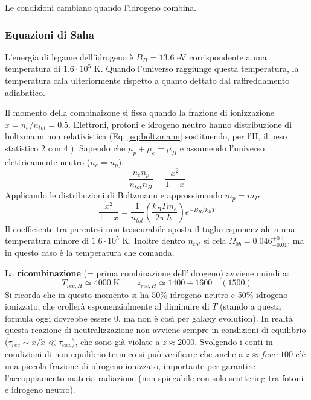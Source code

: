 {Le condizioni cambiano quando l'idrogeno combina.

\subsubsection{Equazioni di Saha}
L'energia di legame dell'idrogeno è $B_H=13.6$ eV corrispondente a una temperatura di $1.6\cdot 10^5$ K. Quando l'universo raggiunge questa temperatura, la temperatura cala ulteriormente rispetto a quanto dettato dal raffreddamento adiabatico. 

Il momento della combinaizone si fissa quando la frazione di ionizzazione $x=n_e/n_{tot}=0.5$. Elettroni, protoni e idrogeno neutro hanno distribuzione di boltzmann non relativistica (Eq. \ref{eq:boltzmann} sostituendo, per l'H, il peso statistico $2$ con $4$ ). Sapendo che $\mu_p + \mu_e = \mu_H$ e assumendo l'universo elettricamente neutro ($n_e=n_p$):
\begin{equation}
    \frac{n_e n_p}{n_{tot}n_H}=\frac{x^2}{1-x}
\end{equation}
Applicando le distribuzioni di Boltzmann e approssimando $m_p=m_H$:
\begin{equation}
    \frac{x^2}{1-x} = \frac{1}{n_{tot}}\left( \frac{k_B T m_e}{2 \pi \hslash }\right) e^{- B_H / k_B T } 
\end{equation}
Il coefficiente tra parentesi non trascurabile sposta il taglio esponenziale a una temperatura minore di $1.6\cdot 10^5$ K. Inoltre dentro $n_{tot}$ si cela $\Omega_{0b}=0.046^{+0.1}_{-0.01}$, ma in questo caso è la temperatura che comanda. 

\vspace{1em}
La \textbf{ricombinazione} (= prima combinazione dell'idrogeno) avviene quindi a: $$T_{rec,H} \simeq 4000\; \textrm{K} \qquad z_{rec,H}\simeq 1400 \div 1600\quad (1500) $$
Si ricorda che in questo momento si ha 50\% idrogeno neutro e 50\% idrogeno ionizzato, che crollerà esponenzialmente al diminuire di $T$ (stando a questa formula oggi dovrebbe essere $0$, ma non è così per galaxy evolution).
In realtà questa reazione di neutralizzazione non avviene sempre in condizioni di equilibrio ($\tau_{rec} \sim x/\dot{x} \ll \tau_{exp}$), che sono già violate a $z\approx 2000$. Svolgendo i conti in condizioni di non equilibrio termico si può verificare che anche a $z\approx few \cdot 100$ c'è una piccola frazione di idrogeno ionizzato, importante per garantire l'accoppiamento materia-radiazione (non spiegabile con solo scattering tra fotoni e idrogeno neutro).

}
